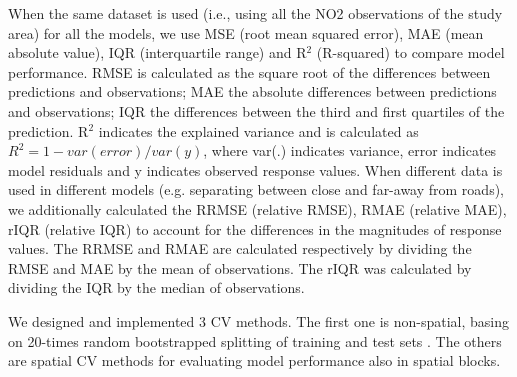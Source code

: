 \documentclass{article}
\begin{document}
When the same dataset is used (i.e., using all the NO2 observations of the study area) for all the models, we use MSE (root mean squared error), MAE (mean absolute value), IQR (interquartile range) and R$^2$ (R-squared) to compare model performance.   
RMSE is calculated as the square root of the differences between predictions and observations; MAE the absolute differences between predictions and observations; IQR the differences between the third and first quartiles of the prediction. R$^2$ indicates the explained variance and is calculated as $R^2 = 1- var(error) / var(y)$, where var(.) indicates variance, error indicates model residuals and y indicates observed response values. When different data is used in different models (e.g. separating between close and far-away from roads), we additionally calculated the RRMSE (relative RMSE), RMAE (relative MAE), rIQR (relative IQR) to account for the differences in the magnitudes of response values. The RRMSE and RMAE are calculated respectively by dividing the RMSE and MAE by the mean of observations. The rIQR was calculated by dividing the IQR by the median of observations.  

We designed and implemented 3 CV methods. The first one is non-spatial, basing on 20-times random bootstrapped splitting of training and test sets \citep{luglobal}. The others are spatial CV methods for evaluating model performance also in spatial blocks. 
\end{document}
